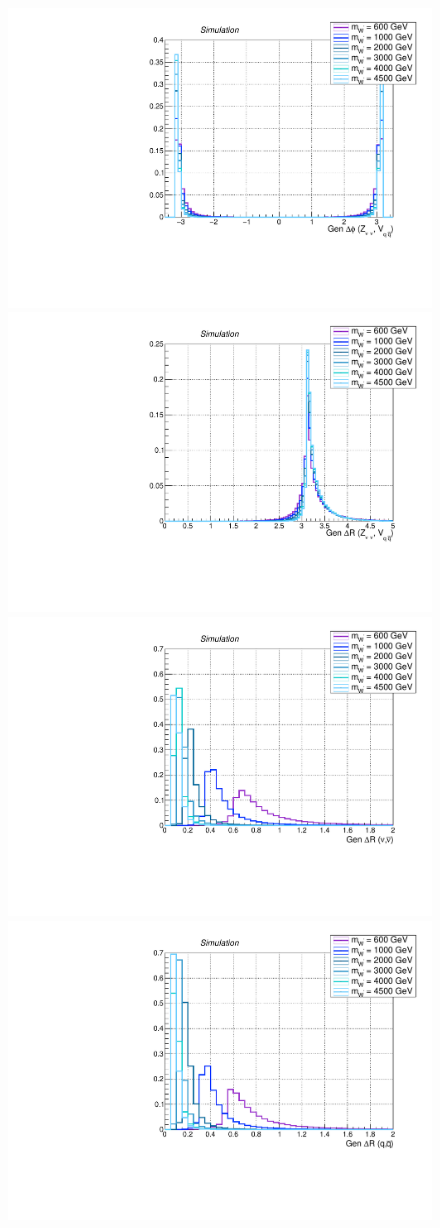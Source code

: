  \begin{figure}[!htb]
   \begin{center}
     \includegraphics[width=.495\textwidth]{Gen_v9/XWZInv_g_VZDPhi.pdf}%
     \includegraphics[width=.495\textwidth]{Gen_v9/XWZInv_g_VZDR.pdf}%
     \\
     \includegraphics[width=.495\textwidth]{Gen_v9/XWZInv_g_LepDR.pdf}%
     \includegraphics[width=.495\textwidth]{Gen_v9/XWZInv_g_HadDR.pdf}%
     \\

\end{center}
\end{figure}
